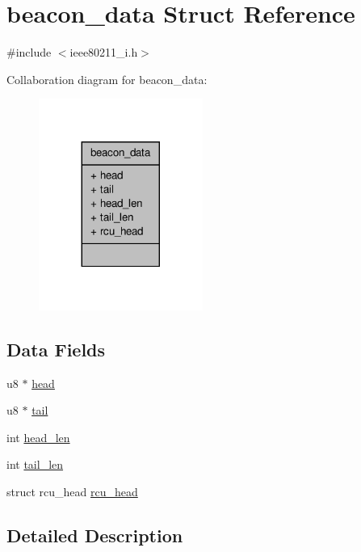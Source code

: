 \hypertarget{structbeacon__data}{\section{beacon\-\_\-data Struct Reference}
\label{structbeacon__data}
}


{\ttfamily \#include $<$ieee80211\-\_\-i.\-h$>$}



Collaboration diagram for beacon\-\_\-data\-:
\nopagebreak
\begin{figure}[H]
\begin{center}
\leavevmode
\includegraphics[width=152pt]{structbeacon__data__coll__graph}
\end{center}
\end{figure}
\subsection*{Data Fields}
\begin{DoxyCompactItemize}
\item 
u8 $\ast$ \hyperlink{structbeacon__data_a88a17ac21eb16e4d6d10b556a019aa14}{head}
\item 
u8 $\ast$ \hyperlink{structbeacon__data_a4474db8b875e66d6e97dad3d131e0259}{tail}
\item 
int \hyperlink{structbeacon__data_a60f685cd83e38123312aed3f02c63646}{head\-\_\-len}
\item 
int \hyperlink{structbeacon__data_a7e0d46a3d87c9fed4f5a67e933849488}{tail\-\_\-len}
\item 
struct rcu\-\_\-head \hyperlink{structbeacon__data_ab698383409a24791490f962fe6990655}{rcu\-\_\-head}
\end{DoxyCompactItemize}


\subsection{Detailed Description}


